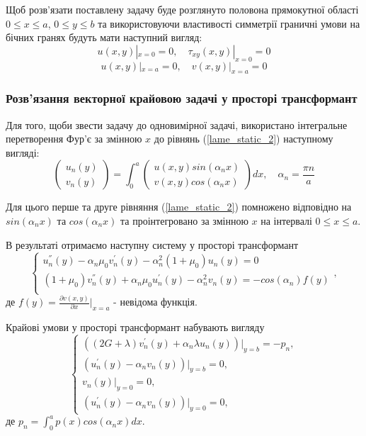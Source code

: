 Щоб розв'язати поставлену задачу буде розглянуто половона прямокутної області $0 \le x \le a$, $0 \le y \le b$
та використовуючи властивості симметрії граничні умови на бічних гранях будуть мати наступний вигляд:
\begin{equation}\label{bound_4_static_2}
    u(x,y) |_{x=0} = 0, \quad \tau_{xy}(x,y) |_{x=0} =0
\end{equation}
\begin{equation}\label{bound_5_static_2}
    u(x,y) |_{x=a} = 0, \quad v(x,y) |_{x=a} = 0
\end{equation}

\subsubsection{Розв'язання векторної крайовою задачі у просторі трансформант}
Для того, щоби звести задачу до одновимірної задачі, використано інтегральне перетворення Фур'є за змінною $x$ до рівнянь (\ref{lame_static_2}) наступному вигляді:
\begin{equation}
    \begin{pmatrix}
        u_n(y) \\
        v_n(y)
    \end{pmatrix} = \int_{0}^{a} 
    \begin{pmatrix}
        u(x,y) sin(\alpha_n x) \\
        v(x,y) cos(\alpha_n x)
    \end{pmatrix} dx, \quad \alpha_n = \frac{\pi n}{a}
\end{equation}

Для цього перше та друге рівняння (\ref{lame_static_2}) помножено відповідно на $sin(\alpha_n x)$ та $cos(\alpha_n x)$ та проінтегровано за змінною $x$ на інтервалі $0 \le x \le a$.

В результаті отримаємо наступну систему у просторі трансформант
\begin{equation}\label{transf_static_2}
    \begin{cases}
        u_n^{''}(y) - \alpha_n \mu_0 v_n^{'}(y) - \alpha_n^2 (1 + \mu_0) u_n(y) = 0 \\
        (1 + \mu_0) v_n^{''}(y) + \alpha_n \mu_0 u_n^{'}(y)  - \alpha_n^2 v_n(y) = -cos(\alpha_n) f(y) \\
    \end{cases},
\end{equation}
де $f(y) = \frac{\partial v(x,y)}{\partial x}|_{x=a}$ - невідома функція.

Крайові умови у просторі трансформант набувають вигляду
\begin{equation}\label{transf_bound_static_2}
    \begin{cases}
        \left( (2G + \lambda)v_n^{'}(y) + \alpha_n \lambda u_n(y) \right)|_{y=b} = -p_n, \\
        \left(u_n^{'}(y) - \alpha_n v_n(y)  \right)|_{y=b} = 0, \\
        v_n(y)|_{y=0} = 0, \\
        \left(u_n^{'}(y) - \alpha_n v_n(y)  \right)|_{y=0} = 0,
    \end{cases}
\end{equation}
де $p_n = \int_{0}^{a} p(x) cos(\alpha_n x) dx$.

